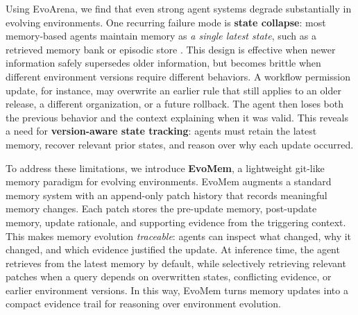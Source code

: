 \documentclass{article}
\begin{document}
Using EvoArena, we find that even strong agent systems degrade substantially in evolving environments. One recurring failure mode is \textbf{state collapse}: most memory-based agents maintain memory as \textit{a single latest state}, such as a retrieved memory bank or episodic store \cite{ mem0,xu2025amem, memento-s}. This design is effective when newer information safely supersedes older information, but becomes brittle when different environment versions require different behaviors. A workflow permission update, for instance, may overwrite an earlier rule that still applies to an older release, a different organization, or a future rollback. The agent then loses both the previous behavior and the context explaining when it was valid. This reveals a need for \textbf{version-aware state tracking}: agents must retain the latest memory, recover relevant prior states, and reason over why each update occurred.




To address these limitations, we introduce \textbf{EvoMem}, a lightweight git-like memory paradigm for evolving environments. EvoMem augments a standard memory system with an append-only patch history that records meaningful memory changes. Each patch stores the pre-update memory, post-update memory, update rationale, and supporting evidence from the triggering context. This makes memory evolution \emph{traceable}: agents can inspect what changed, why it changed, and which evidence justified the update. At inference time, the agent retrieves from the latest memory by default, while selectively retrieving relevant patches when a query depends on overwritten states, conflicting evidence, or earlier environment versions. In this way, EvoMem turns memory updates into a compact evidence trail for reasoning over environment evolution.
\end{document}
